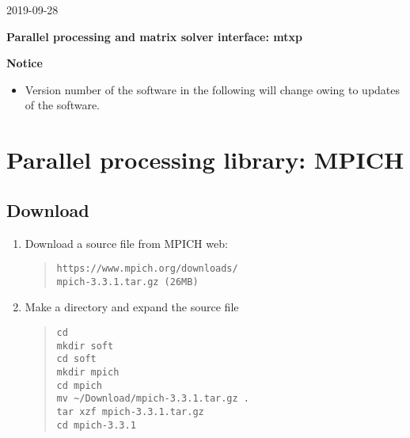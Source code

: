 \documentclass[11pt]{article}
\begin{document}
\begin{flushright}
2019-09-28
\end{flushright}

\begin{center}
{\Large \bf Parallel processing and matrix solver interface: mtxp}
\end{center}

\tableofcontents

\bigskip
\begin{center}
\textbf{Notice}
\end{center}
\begin{itemize}
\item
Version number of the software in the following will change owing to
updates of the software.
\end{itemize}
\bigskip

\section{Parallel processing library: MPICH}

\subsection{Download}

\begin{enumerate}
\item
Download a source file from MPICH web: 
\begin{quote}
\begin{verbatim}
https://www.mpich.org/downloads/
mpich-3.3.1.tar.gz (26MB)
\end{verbatim}
\end{quote}
\item
Make a directory and expand the source file
\begin{quote}
\begin{verbatim}
cd
mkdir soft
cd soft
mkdir mpich
cd mpich
mv ~/Download/mpich-3.3.1.tar.gz .
tar xzf mpich-3.3.1.tar.gz
cd mpich-3.3.1
\end{verbatim}
\end{quote}
\end{enumerate}
\end{document}
